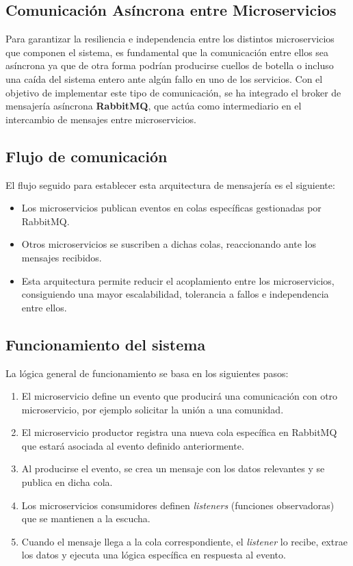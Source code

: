 \subsection{Comunicación Asíncrona entre Microservicios}

Para garantizar la resiliencia e independencia entre los distintos microservicios que componen el sistema, es fundamental que la comunicación entre ellos sea asíncrona ya que de otra forma podrían producirse cuellos de botella o incluso una caída del sistema entero ante algún fallo en uno de los servicios.
Con el objetivo de implementar este tipo de comunicación, se ha integrado el broker de mensajería asíncrona \textbf{RabbitMQ}, que actúa como intermediario en el intercambio de mensajes entre microservicios.

\subsection*{Flujo de comunicación}

El flujo seguido para establecer esta arquitectura de mensajería es el siguiente:

\begin{itemize}
    \item Los microservicios publican eventos en colas específicas gestionadas por RabbitMQ.
    \item Otros microservicios se suscriben a dichas colas, reaccionando ante los mensajes recibidos.
    \item Esta arquitectura permite reducir el acoplamiento entre los microservicios, consiguiendo una mayor escalabilidad, tolerancia a fallos e independencia entre ellos.
\end{itemize}

\subsection*{Funcionamiento del sistema}

La lógica general de funcionamiento se basa en los siguientes pasos:

\begin{enumerate}[label=\textbf{\arabic*.}]
    \item El microservicio define un evento que producirá una comunicación con otro microservicio, por ejemplo solicitar la unión a una comunidad.
    \item El microservicio productor registra una nueva cola específica en RabbitMQ que estará asociada al evento definido anteriormente.
    \item Al producirse el evento, se crea un mensaje con los datos relevantes y se publica en dicha cola.
    \item Los microservicios consumidores definen \textit{listeners} (funciones observadoras) que se mantienen a la escucha.
    \item Cuando el mensaje llega a la cola correspondiente, el \textit{listener} lo recibe, extrae los datos y ejecuta una lógica específica en respuesta al evento.
\end{enumerate}

